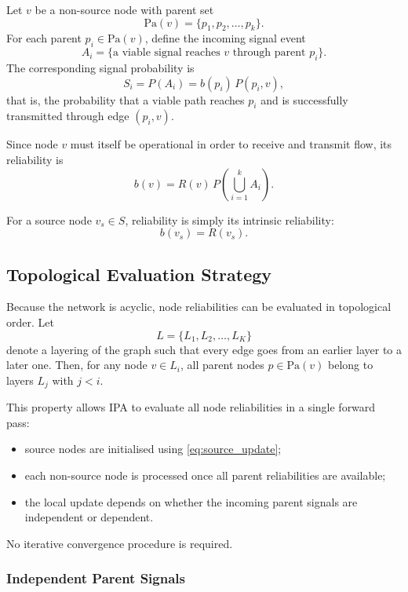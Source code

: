 \documentclass[preprint,12pt]{elsarticle}
\begin{document}
Let $v$ be a non-source node with parent set
\[
\text{Pa}(v) = \{p_1, p_2, \ldots, p_k\}.
\]
For each parent $p_i \in \text{Pa}(v)$, define the incoming signal event
\[
A_i = \{\text{a viable signal reaches } v \text{ through parent } p_i\}.
\]
The corresponding signal probability is
\begin{equation}
S_i = P(A_i) = b(p_i)\,P(p_i,v),
\end{equation}
that is, the probability that a viable path reaches $p_i$ and is successfully transmitted through edge $(p_i,v)$.

Since node $v$ must itself be operational in order to receive and transmit flow, its reliability is
\begin{equation}
b(v) = R(v)\,P\left(\bigcup_{i=1}^{k} A_i\right).
\label{eq:general_belief_update}
\end{equation}

For a source node $v_s \in S$, reliability is simply its intrinsic reliability:
\begin{equation}
b(v_s) = R(v_s).
\label{eq:source_update}
\end{equation}

\subsection{Topological Evaluation Strategy}

Because the network is acyclic, node reliabilities can be evaluated in topological order. Let
\[
L = \{L_1, L_2, \ldots, L_K\}
\]
denote a layering of the graph such that every edge goes from an earlier layer to a later one. Then, for any node $v \in L_i$, all parent nodes $p \in \text{Pa}(v)$ belong to layers $L_j$ with $j < i$.

This property allows IPA to evaluate all node reliabilities in a single forward pass:
\begin{itemize}
    \item source nodes are initialised using \eqref{eq:source_update};
    \item each non-source node is processed once all parent reliabilities are available;
    \item the local update depends on whether the incoming parent signals are independent or dependent.
\end{itemize}

No iterative convergence procedure is required.

\subsubsection{Independent Parent Signals}
\end{document}
